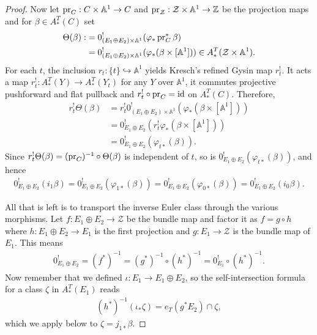 \documentclass[12pt,dvipsnames]{amsart}
\begin{document}
\begin{proof}
  Now let \(\operatorname{pr}_C:C\times \mathbb A^1 \to C\) and \(\operatorname{pr}_{\mathcal Z}:\mathcal Z\times \mathbb A^1\to \mathbb Z\) be the projection maps and for \(\beta \in A^T_*(C)\) set
  \begin{align*}
    \Theta(\beta) :&= 0^!_{(E_1\oplus E_2) \times \mathbb A^1} (\varphi_*\operatorname{pr}^*_C\beta) \\
    &= 0^!_{(E_1\oplus E_2) \times \mathbb A^1} (\varphi_*(\beta \times [\mathbb A^1])) \in A^T_*(\mathcal Z\times\mathbb A^1).
  \end{align*}
  For each \(t\), the inclusion \(r_t:\{t\}\hookrightarrow \mathbb A^1\) yields Kresch's refined Gysin map \(r^!_t\). It acts a map \(r^!_t:A^T_*(Y)\to A^T_*(Y_t)\) for any \(Y\) over \(\mathbb A^1\), it commutes projective pushforward and flat pullback and \(r^!_t\circ \operatorname{pr}_C = \operatorname{id}\) on \(A^T_*(C)\). Therefore,
  \begin{align*}
    r^!_t\Theta(\beta) &= r^!_t0^!_{(E_1\oplus E_2) \times \mathbb A^1}(\varphi_*(\beta \times [\mathbb A^1])) \\
    &= 0^!_{E_1\oplus E_2}(r^!_t\varphi_{*}(\beta \times [\mathbb A^1])) \\
    &= 0^!_{E_1\oplus E_2}(\varphi_{t*}(\beta)).
  \end{align*}
  Since \(r^!_t\Theta(\beta) = (\operatorname{pr}_C)^{-1}\circ \Theta(\beta)\) is independent of \(t\), so is \(0^!_{E_1\oplus E_2}(\varphi_{t*}(\beta))\), and hence
  \begin{align*}
    0^!_{E_1\oplus E_2} (i_1\beta) = 0^!_{E_1\oplus E_2}(\varphi_{1*}(\beta)) = 0^!_{E_1\oplus E_2}(\varphi_{0*}(\beta)) = 0^!_{E_1\oplus E_2}(i_0\beta).
  \end{align*}

  All that is left is to transport the inverse Euler class through the various morphisms. Let \(f:E_1\oplus E_2\to \mathcal Z\) be the bundle map and factor it as \(f = g\circ h\) where \(h:E_1\oplus E_2\to E_1\) is the first projection and \(g:E_1\to \mathcal Z\) is the bundle map of \(E_1\). This means
  \begin{align*}
    0^!_{E_1\oplus E_2} = (f^*)^{-1} = (g^{*})^{-1}\circ (h^*)^{-1} = 0^!_{E_1} \circ (h^*)^{-1}.
  \end{align*}
  Now remember that we defined \(\iota:E_1\to E_1\oplus E_2\), so the self-intersection formula for a class \(\zeta\) in \(A_*^T(E_1)\) reads
  \begin{align*}
    (h^*)^{-1}(\iota_* \zeta) = e_T(g^*E_2) \cap \zeta,
  \end{align*}
  which we apply below to \(\zeta = j_{1*}\beta\).


\end{proof}
\end{document}
